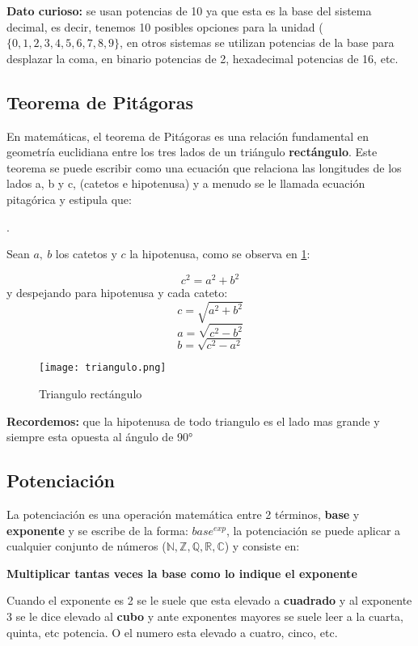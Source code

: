     \textbf{Dato curioso:} se usan potencias de 10 ya que esta es la base del
    sistema decimal, es decir, tenemos 10 posibles opciones para la unidad
    ($\{0,1,2,3,4,5,6,7,8,9\}$, en otros sistemas se utilizan potencias de la base
    para desplazar la coma, en binario potencias de 2, hexadecimal potencias de 16,
    etc.

\newpage
\subsection{Teorema de Pitágoras}
    En matemáticas, el teorema de Pitágoras es una relación fundamental en
    geometría euclidiana entre los tres lados de un triángulo \textbf{rectángulo}.
    Este teorema se puede escribir como una ecuación que relaciona las longitudes
    de los lados a, b y c, (catetos e hipotenusa) y a menudo se le  llamada ecuación
    pitagórica y estipula que:

    .

    Sean $a,\ b$ los catetos y $c$ la hipotenusa, como se observa en \ref{triangulo}:

    $$c^2 = a^2+b^2$$
    y despejando para hipotenusa y cada cateto:
    $$c= \sqrt{a^2+b^2}$$
    $$a=\sqrt{c^2-b^2}$$
    $$b= \sqrt{c^2-a^2}$$


    \begin{figure}[htb]
		\centering
        \caption{Triangulo rectángulo}
		\texttt{[image: triangulo.png]}
		\label{triangulo}
	\end{figure}

    \textbf{Recordemos:} que la hipotenusa de todo triangulo es el lado mas grande
    y siempre esta opuesta al ángulo de 90°


\newpage
\subsection{Potenciación}
    La potenciación es una operación matemática entre 2 términos, \textbf{base}
    y \textbf{exponente} y se escribe de la forma: $base^{exp}$, la potenciación
    se puede aplicar a cualquier conjunto de números ($\mathbb{N}, \mathbb{Z},
    \mathbb{Q}, \mathbb{R}, \mathbb{C}$) y consiste en:

    \textbf{Multiplicar tantas veces la base como lo indique el exponente}

    Cuando el exponente es 2 se le suele que esta elevado a \textbf{cuadrado}
    y al exponente 3 se le dice elevado al \textbf{cubo} y ante exponentes mayores
    se suele leer a la cuarta, quinta, etc potencia. O el numero esta elevado a
    cuatro, cinco, etc.

